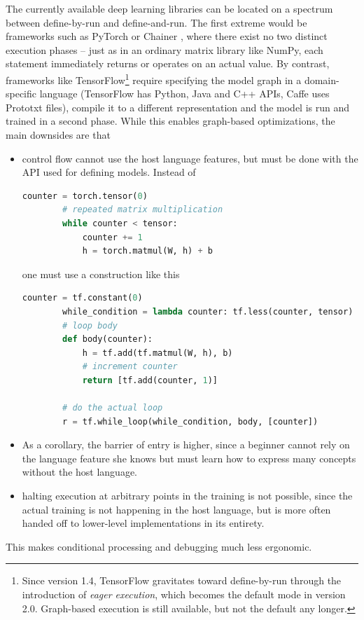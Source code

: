 The currently available deep learning libraries can be located on a spectrum
between define-by-run and define-and-run.  The first extreme would be
frameworks such as PyTorch \citep{paszke2017automatic} or Chainer
\citep{tokui2015chainer} , where there exist no two distinct execution phases --
just as in an ordinary matrix library like NumPy, each statement immediately
returns or operates on an actual value. By contrast, frameworks like
TensorFlow\footnote{Since version 1.4, TensorFlow gravitates toward
    define-by-run through the introduction of \emph{eager execution}, which
becomes the default mode in version 2.0. Graph-based execution is still
available, but not the default any longer.} require specifying the model graph
in a domain-specific language (TensorFlow has Python, Java and C++ APIs, Caffe
uses Prototxt files), compile it to a different representation and the model
is run and trained in a second phase. While this enables graph-based
optimizations, the main downsides are that

\begin{itemize}
    \item
        control flow cannot use the host language features, but must be done
        with the API used for defining models. Instead of
        \begin{lstlisting}[language=Python, label=lst:whilepy-pt, gobble=8]
        counter = torch.tensor(0)
        # repeated matrix multiplication
        while counter < tensor:
            counter += 1
            h = torch.matmul(W, h) + b
        \end{lstlisting}

        one must use a construction like this
        \begin{lstlisting}[language=Python, label=lst:whilepy-tf, gobble=8]
        counter = tf.constant(0)
        while_condition = lambda counter: tf.less(counter, tensor)
        # loop body
        def body(counter):
            h = tf.add(tf.matmul(W, h), b)
            # increment counter
            return [tf.add(counter, 1)]

        # do the actual loop
        r = tf.while_loop(while_condition, body, [counter])
        \end{lstlisting}
    \item
        As a corollary, the barrier of entry is higher, since a beginner cannot rely on the
        language feature she knows but must learn how to express many concepts
        without the host language.
    \item
        halting execution at arbitrary points in the training is not possible,
        since the actual training is not happening in the host language, but
        is more often handed off to lower-level implementations in its
        entirety.
\end{itemize}
This makes conditional processing and debugging much less ergonomic.


